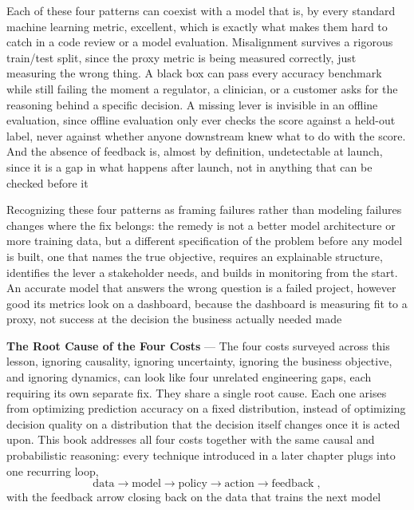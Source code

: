 Each of these four patterns can coexist with a model that is, by every standard machine
learning metric, excellent, which is exactly what makes them hard to catch in a code
review or a model evaluation. Misalignment survives a rigorous train/test split,
since the proxy metric is being measured correctly, just measuring the wrong
thing. A black box can pass every accuracy benchmark while still failing the moment
a regulator, a clinician, or a customer asks for the reasoning behind a specific
decision. A missing lever is invisible in an offline evaluation, since offline evaluation
only ever checks the score against a held-out label, never against whether
anyone downstream knew what to do with the score. And the absence of feedback is,
almost by definition, undetectable at launch, since it is a gap in what happens
after launch, not in anything that can be checked before it

Recognizing these four patterns as framing failures rather than modeling
failures changes where the fix belongs: the remedy is not a better model architecture
or more training data, but a different specification of the problem before any
model is built, one that names the true objective, requires an explainable
structure, identifies the lever a stakeholder needs, and builds in monitoring
from the start. An accurate model that answers the wrong question is a failed project,
however good its metrics look on a dashboard, because the dashboard is measuring
fit to a proxy, not success at the decision the business actually needed made

\textbf{The Root Cause of the Four Costs} --- The four costs surveyed across this
lesson, ignoring causality, ignoring uncertainty, ignoring the business objective,
and ignoring dynamics, can look like four unrelated engineering gaps, each
requiring its own separate fix. They share a single root cause. Each one arises
from optimizing prediction accuracy on a fixed distribution, instead of optimizing
decision quality on a distribution that the decision itself changes once it is acted
upon. This book addresses all four costs together with the same causal and
probabilistic reasoning: every technique introduced in a later chapter plugs into
one recurring loop,
\begin{equation}
  \label{eq:decision-loop}\text{data}\to \text{model}\to \text{policy}\to \text{action}
  \to \text{feedback}\;,
\end{equation}
with the feedback arrow closing back on the data that trains the next model

